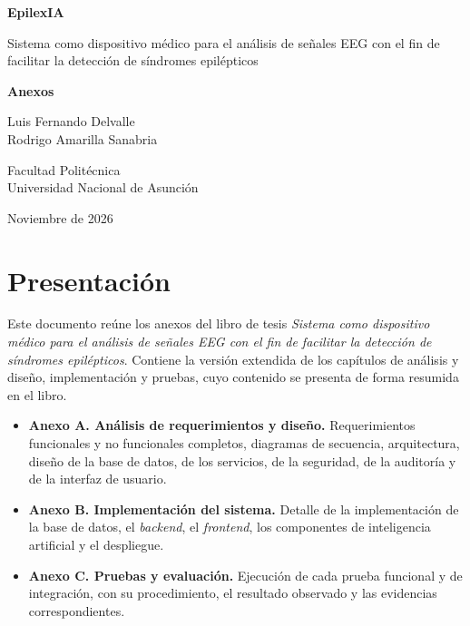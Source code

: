 \documentclass[spanish, 12pt, oneside]{Thesis}
\begin{document}
\addto\captionsspanish{\renewcommand{\appendixname}{Anexo}}
\renewcommand{\appendixname}{Anexo}

\pagestyle{empty}
\begin{center}
\vspace*{4cm}
{\LARGE\bfseries EpilexIA\par}
\vspace{0.8cm}
{\Large Sistema como dispositivo médico para el análisis de señales EEG con el fin de facilitar la detección de síndromes epilépticos\par}
\vspace{2cm}
{\huge\bfseries Anexos\par}
\vspace{2cm}
{\large Luis Fernando Delvalle \\ Rodrigo Amarilla Sanabria\par}
\vspace{1.5cm}
{\large Facultad Politécnica \\ Universidad Nacional de Asunción\par}
\vfill
{\large Noviembre de 2026\par}
\end{center}
\clearpage

\pagestyle{fancy}
\chapter*{Presentación}

Este documento reúne los anexos del libro de tesis \emph{Sistema como dispositivo médico para el análisis de señales EEG con el fin de facilitar la detección de síndromes epilépticos}.
Contiene la versión extendida de los capítulos de análisis y diseño, implementación y pruebas, cuyo contenido se presenta de forma resumida en el libro.

\begin{itemize}
    \item \textbf{Anexo A. Análisis de requerimientos y diseño.} Requerimientos funcionales y no funcionales completos, diagramas de secuencia, arquitectura, diseño de la base de datos, de los servicios, de la seguridad, de la auditoría y de la interfaz de usuario.
    \item \textbf{Anexo B. Implementación del sistema.} Detalle de la implementación de la base de datos, el \textit{backend}, el \textit{frontend}, los componentes de inteligencia artificial y el despliegue.
    \item \textbf{Anexo C. Pruebas y evaluación.} Ejecución de cada prueba funcional y de integración, con su procedimiento, el resultado observado y las evidencias correspondientes.
\end{itemize}
\end{document}
